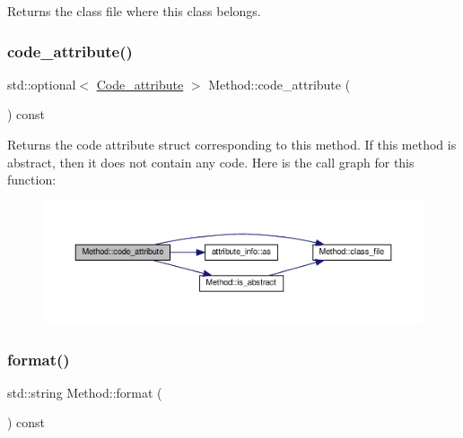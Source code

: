 Returns the class file where this class belongs. 

\mbox{\label{classMethod_af92b40aa1a81df3a6827d688adc005bf}} 
\subsubsection{\texorpdfstring{code\+\_\+attribute()}{code\_attribute()}}
{\footnotesize\ttfamily std\+::optional$<$ \hyperlink{structCode__attribute}{Code\+\_\+attribute} $>$ Method\+::code\+\_\+attribute (\begin{DoxyParamCaption}{ }\end{DoxyParamCaption}) const}

Returns the code attribute struct corresponding to this method. If this method is abstract, then it does not contain any code. Here is the call graph for this function\+:\nopagebreak
\begin{figure}[H]
\begin{center}
\leavevmode
\includegraphics[width=350pt]{classMethod_af92b40aa1a81df3a6827d688adc005bf_cgraph}
\end{center}
\end{figure}
\mbox{\label{classMethod_a3f6d55a368a1e2727bea0799c3cdc0f6}} 
\subsubsection{\texorpdfstring{format()}{format()}}
{\footnotesize\ttfamily std\+::string Method\+::format (\begin{DoxyParamCaption}{ }\end{DoxyParamCaption}) const}


